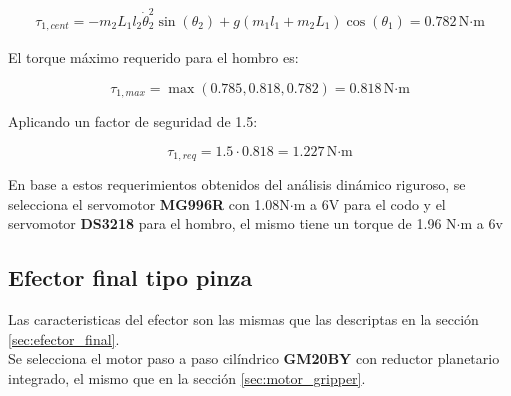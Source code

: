 \begin{multline}
\tau_{1,cent} = - m_2L_1l_2\dot{\theta}_2^2\sin(\theta_2) + g(m_1l_1 + m_2L_1)\cos(\theta_1) = 0.782 \, \text{N·m}
\end{multline}

El torque máximo requerido para el hombro es:

\begin{equation}
\tau_{1,max} = \max(0.785, 0.818, 0.782) = 0.818 \, \text{N·m} 
\end{equation}

Aplicando un factor de seguridad de 1.5:

\begin{equation}
\tau_{1,req} = 1.5 \cdot 0.818 = 1.227 \, \text{N·m}
\end{equation}




En base a estos requerimientos obtenidos del análisis dinámico riguroso, se selecciona el servomotor \textbf{MG996R} con 1.08N$\cdot$m a 6V para el codo y el servomotor \textbf{DS3218} para el hombro, el mismo tiene un torque de 1.96 N$\cdot$m a 6v

\subsection{Efector final tipo pinza}

Las caracteristicas del efector son las mismas que las descriptas en la sección \ref{sec:efector_final}.\\

Se selecciona el motor paso a paso cilíndrico \textbf{GM20BY} con reductor planetario integrado, el mismo que en la sección \ref{sec:motor_gripper}.